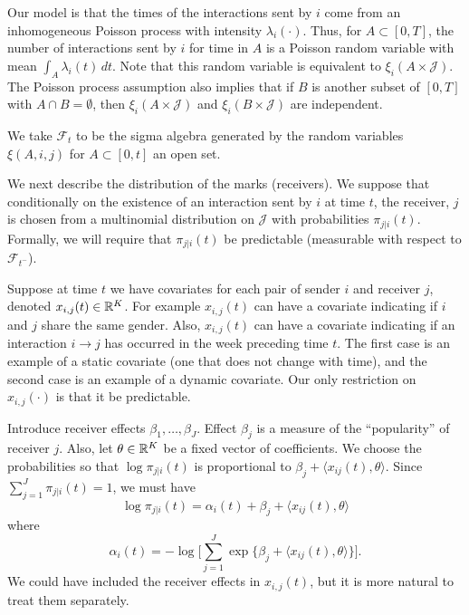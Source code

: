 \documentclass[aoas,preprint]{imsart}
\begin{document}
Our model is that the times of the interactions sent by $i$ come from an inhomogeneous Poisson process with intensity $\lambda_i(\cdot)$.  Thus,
for $A \subset [0,T]$, the number of interactions sent by $i$ for time
in $A$ is a Poisson random variable with mean $\int_A \lambda_i(t) \, dt$.
Note that this random variable is equivalent to
\(
    \xi_i(A \times \mathcal{J}).
\)
The Poisson process assumption also implies that if $B$ is another subset 
of $[0,T]$ with $A \cap B = \emptyset$, then
\(
    \xi_i(A \times \mathcal{J})
\)
and
\(
    \xi_i(B \times \mathcal{J})
\)
are independent.

We take $\mathcal{F}_t$ to be the sigma algebra generated by the
random variables $\xi(A, i, j)$ for $A \subset [0,t]$ an open set.

We next describe the distribution of the marks (receivers). We suppose that
conditionally on the existence of an interaction sent by $i$ at time $t$, the
receiver, $j$ is chosen from a multinomial distribution on $\mathcal{J}$ with
probabilities $\pi_{j | i}(t)$. Formally, we will require that $\pi_{j |
i}(t)$ be predictable (measurable with respect to $\mathcal{F}_{t^-}$).

Suppose at time $t$ we have covariates for each pair of sender $i$ and
receiver $j$, denoted $x_{i,j}(t) \in \mathbb{R}^K$. For example $x_{i,j}(t)$ can
have a covariate indicating if $i$ and $j$ share the same gender. Also,
$x_{i,j}(t)$ can have a covariate indicating if an interaction $i \to j$ has
occurred in the week preceding time $t$. The first case is an example of a
static covariate (one that does not change with time), and the second case is
an example of a dynamic covariate. Our only restriction on $x_{i,j}(\cdot)$ is
that it be predictable.

Introduce receiver effects $\beta_1, \ldots, \beta_J$.  Effect $\beta_j$ is
a measure of the ``popularity'' of receiver $j$.  Also, let $\theta \in \mathbb{R}^K$ be a fixed vector of coefficients.  We choose the probabilities so that $\log \pi_{j|i}(t)$ is proportional to $\beta_j + \langle x_{ij}(t), \theta \rangle$.  Since $\sum_{j=1}^{J} \pi_{j|i}(t) = 1$, we must have
\[
    \log \pi_{j|i}(t)
    = \alpha_i(t) + \beta_j + \langle x_{ij}(t), \theta \rangle
\]
where
\[
    \alpha_i(t)
    = -\log\Big[
        \sum_{j=1}^J \exp\{\beta_j +  \langle x_{ij}(t), \theta \rangle\}
    \Big].
\]
We could have included the receiver effects in $x_{i,j}(t)$, but it is more
natural to treat them separately.





\end{document}
